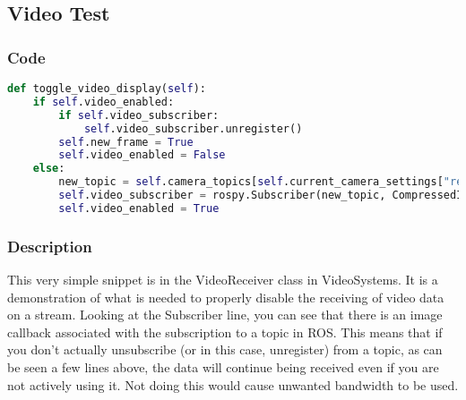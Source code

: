 \subsection{Video Test}
\subsubsection{Code}
\begin{lstlisting}[language=python]
def toggle_video_display(self):
	if self.video_enabled:
		if self.video_subscriber:
			self.video_subscriber.unregister()
		self.new_frame = True
		self.video_enabled = False
	else:
		new_topic = self.camera_topics[self.current_camera_settings["resolution"]]
		self.video_subscriber = rospy.Subscriber(new_topic, CompressedImage, self.__image_data_received_callback)
		self.video_enabled = True
\end{lstlisting}
\subsubsection{Description}
This very simple snippet is in the VideoReceiver class in VideoSystems. It is a demonstration of what is needed to properly disable the receiving of video data on a stream. Looking at the Subscriber line, you can see that there is an image callback associated with the subscription to a topic in ROS. This means that if you don't actually unsubscribe (or in this case, unregister) from a topic, as can be seen a few lines above, the data will continue being received even if you are not actively using it. Not doing this would cause unwanted bandwidth to be used.